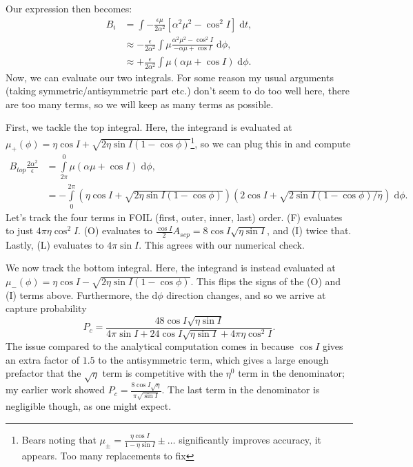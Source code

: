 \documentclass[11pt,
        usenames, %
        dvipsnames %
    ]{article}
\newcommand*{\p}[1]{\left(#1\right)}
\newcommand*{\s}[1]{\left[#1\right]}
\begin{document}
Our expression then becomes:
\begin{align*}
    B_i &= \int -\frac{\epsilon \mu}{2\alpha^2}\s{
        \alpha^2 \mu^2 - \cos^2 I}\;\mathrm{d}t,\\
        &\approx -\frac{\epsilon}{2\alpha^2} \int
            \mu \frac{\alpha^2 \mu^2 - \cos^2 I}{
                -\alpha \mu + \cos I}\;\mathrm{d}\phi,\\
        &\approx +\frac{\epsilon}{2\alpha^2}\int
            \mu\p{\alpha \mu + \cos I}\;\mathrm{d}\phi.
\end{align*}
Now, we can evaluate our two integrals. For some reason my usual arguments
(taking symmetric/antisymmetric part etc.) don't seem to do too well here, there
are too many terms, so we will keep as many terms as possible.

First, we tackle the top integral. Here, the integrand is evaluated at
$\mu_+(\phi) = \eta \cos I + \sqrt{2\eta \sin I\p{1 - \cos \phi}}$\footnote{
Bears noting that $\mu_{\pm} = \frac{\eta \cos I}{1 - \eta \sin I} \pm \dots$
significantly improves accuracy, it appears. Too many replacements to fix}, so
we can plug this in and compute
\begin{align*}
    B_{top}\frac{2\alpha^2}{\epsilon} &= \int\limits_{2\pi}^{0}
            \mu(\alpha \mu + \cos I)\;\mathrm{d}\phi,\\
        &= -\int\limits_0^{2\pi}
            \p{\eta \cos I + \sqrt{2\eta \sin I\p{1 - \cos \phi}}}
                \p{2\cos I + \sqrt{2\sin I\p{1 - \cos \phi}/\eta}}
                \;\mathrm{d}\phi.
\end{align*}
Let's track the four terms in FOIL (first, outer, inner, last) order. (F)
evaluates to just $4\pi \eta \cos^2 I$. (O) evaluates to $\frac{\cos
I}{2}A_{sep} = 8\cos I\sqrt{\eta \sin I}$, and (I) twice that. Lastly, (L)
evaluates to $4\pi \sin I$. This agrees with our numerical check.

We now track the bottom integral. Here, the integrand is instead evaluated at
$\mu_-(\phi) = \eta \cos I - \sqrt{2\eta \sin I\p{1 - \cos \phi}}$. This flips
the signs of the (O) and (I) terms above. Furthermore, the $\mathrm{d}\phi$
direction changes, and so we arrive at capture probability
\begin{equation}
    P_{c} = \frac{48\cos I \sqrt{\eta \sin I}}{
        4\pi \sin I + 24\cos I \sqrt{\eta \sin I} + 4\pi \eta \cos^2 I}.
\end{equation}
The issue compared to the analytical computation comes in because $\cos I$ gives
an extra factor of $1.5$ to the antisymmetric term, which gives a large enough
prefactor that the $\sqrt{\eta}$ term is competitive with the $\eta^0$ term in
the denominator; my earlier work showed $P_c = \frac{8\cos
I\sqrt{\eta}}{\pi \sqrt{\sin I}}$. The last term in the denominator is
negligible though, as one might expect.
\end{document}
